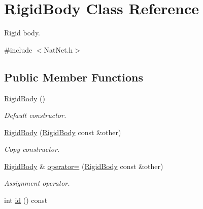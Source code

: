 \hypertarget{classRigidBody}{\section{\-Rigid\-Body \-Class \-Reference}
\label{classRigidBody}
}


\-Rigid body.  




{\ttfamily \#include $<$\-Nat\-Net.\-h$>$}

\subsection*{\-Public \-Member \-Functions}
\begin{DoxyCompactItemize}
\item 
\hypertarget{classRigidBody_a28203d38d278da0695ace20c66ee5f0a}{\hyperlink{classRigidBody_a28203d38d278da0695ace20c66ee5f0a}{\-Rigid\-Body} ()}\label{classRigidBody_a28203d38d278da0695ace20c66ee5f0a}

\begin{DoxyCompactList}\small\item\em \-Default constructor. \end{DoxyCompactList}\item 
\hypertarget{classRigidBody_a21f6709d0695b1bbbc53b3c4ecc65805}{\hyperlink{classRigidBody_a21f6709d0695b1bbbc53b3c4ecc65805}{\-Rigid\-Body} (\hyperlink{classRigidBody}{\-Rigid\-Body} const \&other)}\label{classRigidBody_a21f6709d0695b1bbbc53b3c4ecc65805}

\begin{DoxyCompactList}\small\item\em \-Copy constructor. \end{DoxyCompactList}\item 
\hypertarget{classRigidBody_afa52b4614ec2a06d4c296e2decb15863}{\hyperlink{classRigidBody}{\-Rigid\-Body} \& \hyperlink{classRigidBody_afa52b4614ec2a06d4c296e2decb15863}{operator=} (\hyperlink{classRigidBody}{\-Rigid\-Body} const \&other)}\label{classRigidBody_afa52b4614ec2a06d4c296e2decb15863}

\begin{DoxyCompactList}\small\item\em \-Assignment operator. \end{DoxyCompactList}\item 
\hypertarget{classRigidBody_a14a65e35826b8298f7248d02e09a1e91}{int \hyperlink{classRigidBody_a14a65e35826b8298f7248d02e09a1e91}{id} () const }\label{classRigidBody_a14a65e35826b8298f7248d02e09a1e91}


\end{DoxyCompactItemize}
